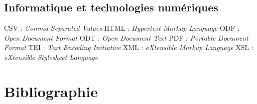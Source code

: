 \documentclass[a4paper,12pt,twoside]{book}
\begin{document}
    \section*{Informatique et technologies numériques}

    \noindent CSV : \textit{Comma-Separated Values}
    \newline 
    HTML : \textit{Hypertext Markup Language}
    \newline 
    ODF : \textit{Open Document Format}
    \newline
    ODT : \textit{Open Document Text}
    \newline 
    PDF : \textit{Portable Document Format}
    \newline 
    TEI : \textit{Text Encoding Initiative}
    \newline 
    XML : \textit{eXtensible Markup Language}
    \newline 
    XSL : \textit{eXtensible Stylesheet Language}

    \newpage{\pagestyle{empty}\cleardoublepage}

    \chapter*{Bibliographie}\printbibliography[title=Diplomatique,heading=subbibliography,keyword=dip]\printbibliography[title=Historiographie,heading=subbibliography,keyword=histo]
    \printbibliography[title=Les ducs de Bourbon,heading=subbibliography,keyword=bourbon] 
    \printbibliography[title=Technologies numériques,heading=subbibliography,keyword=num]
    
 
	
	
	\thispagestyle{empty}
	\cleardoublepage
	
	\mainmatter
	
	
    
	
	
    
    
    
    \backmatter

    \appendix
	
	





	\tableofcontents
	
\end{document}
